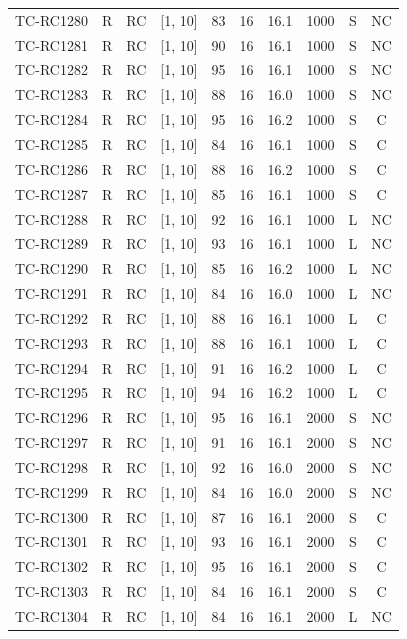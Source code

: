 \begin{longtable}{lccccccccc}
TC-RC1280 & R & RC & [1, 10] & 83 & 16 & 16.1 & 1000 & S & NC \\
TC-RC1281 & R & RC & [1, 10] & 90 & 16 & 16.1 & 1000 & S & NC \\
TC-RC1282 & R & RC & [1, 10] & 95 & 16 & 16.1 & 1000 & S & NC \\
TC-RC1283 & R & RC & [1, 10] & 88 & 16 & 16.0 & 1000 & S & NC \\
TC-RC1284 & R & RC & [1, 10] & 95 & 16 & 16.2 & 1000 & S & C \\
TC-RC1285 & R & RC & [1, 10] & 84 & 16 & 16.1 & 1000 & S & C \\
TC-RC1286 & R & RC & [1, 10] & 88 & 16 & 16.2 & 1000 & S & C \\
TC-RC1287 & R & RC & [1, 10] & 85 & 16 & 16.1 & 1000 & S & C \\
TC-RC1288 & R & RC & [1, 10] & 92 & 16 & 16.1 & 1000 & L & NC \\
TC-RC1289 & R & RC & [1, 10] & 93 & 16 & 16.1 & 1000 & L & NC \\
TC-RC1290 & R & RC & [1, 10] & 85 & 16 & 16.2 & 1000 & L & NC \\
TC-RC1291 & R & RC & [1, 10] & 84 & 16 & 16.0 & 1000 & L & NC \\
TC-RC1292 & R & RC & [1, 10] & 88 & 16 & 16.1 & 1000 & L & C \\
TC-RC1293 & R & RC & [1, 10] & 88 & 16 & 16.1 & 1000 & L & C \\
TC-RC1294 & R & RC & [1, 10] & 91 & 16 & 16.2 & 1000 & L & C \\
TC-RC1295 & R & RC & [1, 10] & 94 & 16 & 16.2 & 1000 & L & C \\
TC-RC1296 & R & RC & [1, 10] & 95 & 16 & 16.1 & 2000 & S & NC \\
TC-RC1297 & R & RC & [1, 10] & 91 & 16 & 16.1 & 2000 & S & NC \\
TC-RC1298 & R & RC & [1, 10] & 92 & 16 & 16.0 & 2000 & S & NC \\
TC-RC1299 & R & RC & [1, 10] & 84 & 16 & 16.0 & 2000 & S & NC \\
TC-RC1300 & R & RC & [1, 10] & 87 & 16 & 16.1 & 2000 & S & C \\
TC-RC1301 & R & RC & [1, 10] & 93 & 16 & 16.1 & 2000 & S & C \\
TC-RC1302 & R & RC & [1, 10] & 95 & 16 & 16.1 & 2000 & S & C \\
TC-RC1303 & R & RC & [1, 10] & 84 & 16 & 16.1 & 2000 & S & C \\
TC-RC1304 & R & RC & [1, 10] & 84 & 16 & 16.1 & 2000 & L & NC \\

\end{longtable}
